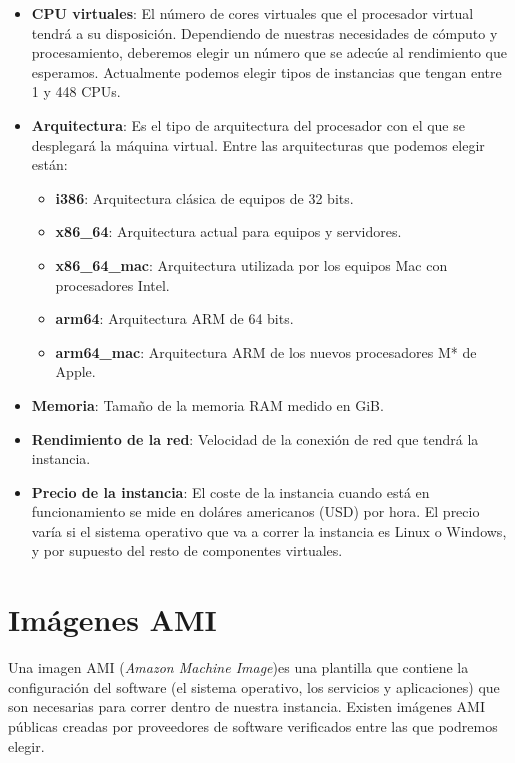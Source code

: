 \begin{itemize}
	\item \textbf{CPU virtuales}: El número de cores virtuales que el procesador virtual tendrá a su disposición. Dependiendo de nuestras necesidades de cómputo y procesamiento, deberemos elegir un número que se adecúe al rendimiento que esperamos. Actualmente podemos elegir tipos de instancias que tengan entre 1 y 448 CPUs.
	
	\item \textbf{Arquitectura}: Es el tipo de arquitectura del procesador con el que se desplegará la máquina virtual. Entre las arquitecturas que podemos elegir están:
	\begin{itemize}
		\item \textbf{i386}: Arquitectura clásica de equipos de 32 bits.
		\item \textbf{x86\_64}: Arquitectura actual para equipos y servidores.
		\item \textbf{x86\_64\_mac}: Arquitectura utilizada por los equipos Mac con procesadores Intel.
		\item \textbf{arm64}: Arquitectura ARM de 64 bits.
		\item \textbf{arm64\_mac}: Arquitectura ARM de los nuevos procesadores M* de Apple.
	\end{itemize}
	
	\item \textbf{Memoria}: Tamaño de la memoria RAM medido en GiB.
	
	\item \textbf{Rendimiento de la red}: Velocidad de la conexión de red que tendrá la instancia.
	
	\item \textbf{Precio de la instancia}: El coste de la instancia cuando está en funcionamiento se mide en doláres americanos (USD) por hora. El precio varía si el sistema operativo que va a correr la instancia es Linux o Windows, y por supuesto del resto de componentes virtuales.
	
\end{itemize}



\section{Imágenes AMI}

Una imagen AMI (\textit{Amazon Machine Image})es una plantilla que contiene la configuración del software (el sistema operativo, los servicios y aplicaciones) que son necesarias para correr dentro de nuestra instancia. Existen imágenes AMI públicas creadas por proveedores de software verificados entre las que podremos elegir. 


